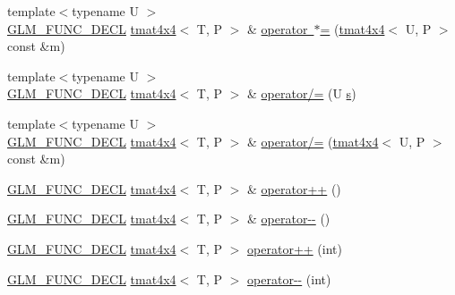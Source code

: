 \begin{DoxyCompactItemize}
\item 
{\footnotesize template$<$typename U $>$ }\\\mbox{\hyperlink{setup_8hpp_ab2d052de21a70539923e9bcbf6e83a51}{G\+L\+M\+\_\+\+F\+U\+N\+C\+\_\+\+D\+E\+CL}} \mbox{\hyperlink{structglm_1_1tmat4x4}{tmat4x4}}$<$ T, P $>$ \& \mbox{\hyperlink{structglm_1_1tmat4x4_ae04b92a9b45cf8ca66e1eab88f238b1e}{operator $\ast$=}} (\mbox{\hyperlink{structglm_1_1tmat4x4}{tmat4x4}}$<$ U, P $>$ const \&m)
\item 
{\footnotesize template$<$typename U $>$ }\\\mbox{\hyperlink{setup_8hpp_ab2d052de21a70539923e9bcbf6e83a51}{G\+L\+M\+\_\+\+F\+U\+N\+C\+\_\+\+D\+E\+CL}} \mbox{\hyperlink{structglm_1_1tmat4x4}{tmat4x4}}$<$ T, P $>$ \& \mbox{\hyperlink{structglm_1_1tmat4x4_a1dff23012c9f5451ebaf7d96934f60cb}{operator/=}} (U \mbox{\hyperlink{glad_8h_af1b1d5edfea6a34daee7389b1b5810ad}{s}})
\item 
{\footnotesize template$<$typename U $>$ }\\\mbox{\hyperlink{setup_8hpp_ab2d052de21a70539923e9bcbf6e83a51}{G\+L\+M\+\_\+\+F\+U\+N\+C\+\_\+\+D\+E\+CL}} \mbox{\hyperlink{structglm_1_1tmat4x4}{tmat4x4}}$<$ T, P $>$ \& \mbox{\hyperlink{structglm_1_1tmat4x4_a0dc88dbbec27980b19dd322695bb2eab}{operator/=}} (\mbox{\hyperlink{structglm_1_1tmat4x4}{tmat4x4}}$<$ U, P $>$ const \&m)
\item 
\mbox{\hyperlink{setup_8hpp_ab2d052de21a70539923e9bcbf6e83a51}{G\+L\+M\+\_\+\+F\+U\+N\+C\+\_\+\+D\+E\+CL}} \mbox{\hyperlink{structglm_1_1tmat4x4}{tmat4x4}}$<$ T, P $>$ \& \mbox{\hyperlink{structglm_1_1tmat4x4_a1ad2e416dfded77b7c5b9c7cc5593a82}{operator++}} ()
\item 
\mbox{\hyperlink{setup_8hpp_ab2d052de21a70539923e9bcbf6e83a51}{G\+L\+M\+\_\+\+F\+U\+N\+C\+\_\+\+D\+E\+CL}} \mbox{\hyperlink{structglm_1_1tmat4x4}{tmat4x4}}$<$ T, P $>$ \& \mbox{\hyperlink{structglm_1_1tmat4x4_a609557d02e1794629bca91f52f74626a}{operator-\/-\/}} ()
\item 
\mbox{\hyperlink{setup_8hpp_ab2d052de21a70539923e9bcbf6e83a51}{G\+L\+M\+\_\+\+F\+U\+N\+C\+\_\+\+D\+E\+CL}} \mbox{\hyperlink{structglm_1_1tmat4x4}{tmat4x4}}$<$ T, P $>$ \mbox{\hyperlink{structglm_1_1tmat4x4_aa3265b4bdfd401c53ffabe57f631f1ca}{operator++}} (int)
\item 
\mbox{\hyperlink{setup_8hpp_ab2d052de21a70539923e9bcbf6e83a51}{G\+L\+M\+\_\+\+F\+U\+N\+C\+\_\+\+D\+E\+CL}} \mbox{\hyperlink{structglm_1_1tmat4x4}{tmat4x4}}$<$ T, P $>$ \mbox{\hyperlink{structglm_1_1tmat4x4_ab1c8914e89847162b577d27d79a2b352}{operator-\/-\/}} (int)

\end{DoxyCompactItemize}
